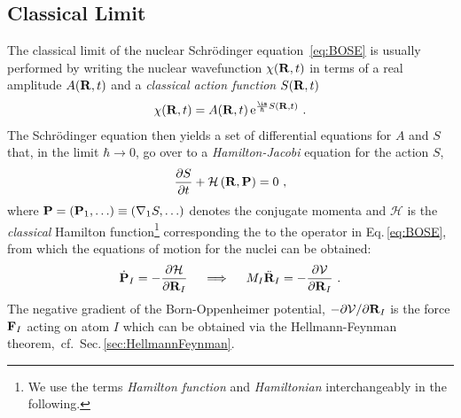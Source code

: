 \subsection{Classical Limit}
The classical limit of the nuclear Schr\"odinger equation~\eqref{eq:BOSE} is usually performed by writing the nuclear wavefunction $\chi ({\bf R}, t)$ in terms of a real amplitude $A({\bf R}, t)$ and a \emph{classical action function} $S({\bf R}, t)$~\cite{Dirac1981,Landau2013,Marx2009}
\begin{align}
\chi({\bf R}, t) = A({\bf R}, t) \, {\rm e}^{\frac{\im}{\hbar} S({\bf R}, t)}~.
\label{eq:class.1}
\end{align}
The Schr\"odinger equation then yields a set of differential equations for $A$ and $S$ that, in the limit $\hbar \to 0$, go over to a \emph{Hamilton-Jacobi} equation for the action $S$,
\begin{align}
\frac{\partial S}{\partial t} + \mathcal H \left({\bf R}, {\bf P}\right)
= 0~,
\label{eq:HamiltonJacobi}
\end{align}
where ${\bf P} = ({\bf P}_1, \ldots) \equiv ({\bf \nabla}_1 S, \ldots)$ denotes the conjugate momenta and $\mathcal H$ is the \emph{classical} Hamilton function\footnote{We use the terms \emph{Hamilton function} and \emph{Hamiltonian} interchangeably in the following.} corresponding the to the operator in Eq.\,\eqref{eq:BOSE}, from which the equations of motion for the nuclei can be obtained:
\begin{align}
\dot{{\bf P}}_I 
= -\frac{\partial \mathcal H}{\partial {\bf R}_I}
\quad\implies\quad M_I \ddot{\bf R}_I
= -\frac{\partial \mathcal V}{\partial {\bf R}_I}~.
\label{eq:dyn.eom.classical}
\end{align}
The negative gradient of the Born-Oppenheimer potential, 
$-\partial \mathcal V / \partial {\bf R}_I$ is the force ${\bf F}_I$ acting on atom $I$ which can be obtained via the Hellmann-Feynman theorem,~cf.~Sec.\,\ref{sec:HellmannFeynman}.

